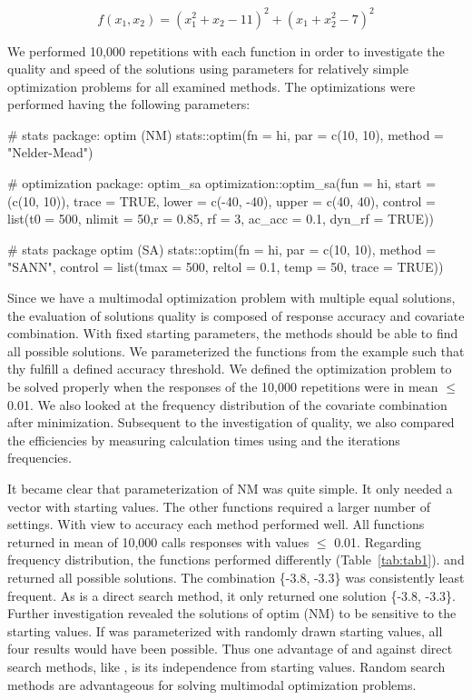 \begin{equation}
\label{eq:eq2}
f(x_1,x_2)=(x_1^2+x_2-11)^2+(x_1+x_2^2-7)^2
\end{equation}

We performed 10,000 repetitions with each function in order to investigate the quality and speed of the solutions using parameters for relatively simple optimization problems for all examined methods. The optimizations were performed having the following parameters:
    
    \begin{example}
# stats package: optim (NM)
stats::optim(fn = hi, par = c(10, 10), method = "Nelder-Mead")

# optimization package: optim_sa
optimization::optim_sa(fun = hi, start = (c(10, 10)), trace = TRUE, 
                       lower = c(-40, -40), upper = c(40, 40),
                       control = list(t0 = 500, nlimit = 50,r = 0.85,
                                      rf = 3, ac_acc = 0.1, dyn_rf = TRUE))

# stats package optim (SA)
stats::optim(fn = hi, par = c(10, 10), method = "SANN",
             control = list(tmax = 500, reltol = 0.1, temp = 50, trace = TRUE))
\end{example}
Since we have a multimodal optimization problem with multiple equal solutions, the evaluation of solutions quality is composed of response accuracy and covariate combination. With fixed starting parameters, the methods should be able to find all possible solutions.  We  parameterized the functions from the example such that thy fulfill a defined accuracy threshold. We defined the optimization problem to be solved  properly when the responses of the 10,000 repetitions were in mean $\leq$ 0.01. We also looked at the frequency distribution of the covariate combination after minimization. Subsequent to the investigation of quality, we also compared the efficiencies by measuring calculation times using  and the iterations frequencies.

It became clear that parameterization of NM was quite simple. It only needed a vector with starting values. The other functions required a larger number of settings. With view to accuracy each method performed well. All functions returned in mean of 10,000 calls responses with values $\leq$ 0.01. Regarding frequency distribution, the functions performed differently (Table~\ref{tab:tab1}).  and  returned all possible solutions. The combination \{-3.8, -3.3\} was consistently least frequent. As  is a direct search method, it only returned one solution \{-3.8, -3.3\}. Further investigation revealed the solutions of optim (NM) to be sensitive to the starting values. If  was parameterized with randomly drawn starting values, all four results would have been possible. Thus one advantage of  and  against direct search methods, like , is its independence from starting values. Random search methods are advantageous for solving multimodal optimization problems.

